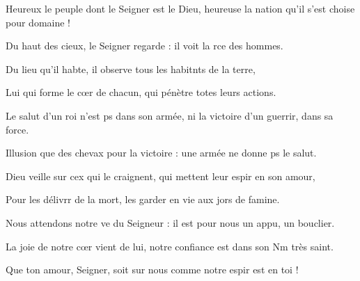 \item Heureux le peuple dont le Seigner est le Dieu,\psstar{} heureuse la nation qu’il s’est choise pour domaine !
\item Du haut des cieux, le Seigner regarde :\psstar{} il voit la rce des hommes.
\item Du lieu qu’il habte, il observe\psstar{} tous les habitnts de la terre,
\item Lui qui forme le cœr de chacun,\psstar{} qui pénètre totes leurs actions.
\item Le salut d’un roi n’est ps dans son armée,\psstar{} ni la victoire d’un guerrir, dans sa force.
\item Illusion que des chevax pour la victoire :\psstar{} une armée ne donne ps le salut.
\item Dieu veille sur cex qui le craignent,\psstar{} qui mettent leur espir en son amour,
\item Pour les délivrr de la mort,\psstar{} les garder en vie aux jors de famine.
\item Nous attendons notre ve du Seigneur :\psstar{} il est pour nous un appu, un bouclier.
\item La joie de notre cœr vient de lui,\psstar{} notre confiance est dans son Nm très saint.
\item Que ton amour, Seigner, soit sur nous\psstar{} comme notre espir est en toi !